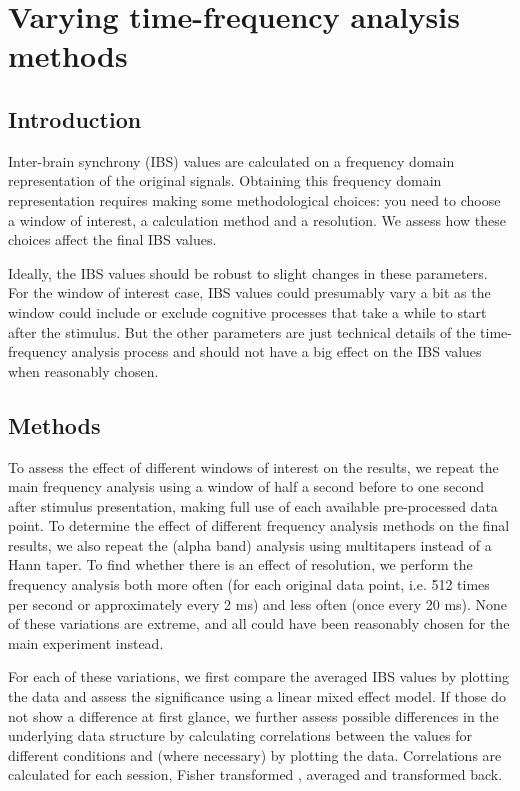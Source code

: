 
\section{Varying time-frequency analysis methods}

\subsection{Introduction}

Inter-brain synchrony (IBS) values are calculated on a frequency domain
representation of the original signals. Obtaining this frequency domain
representation requires making some methodological choices: you need to choose
a window of interest, a calculation method and a resolution. We assess how these
choices affect the final IBS values.

Ideally, the IBS values should be robust to slight changes in these parameters.
For the window of interest case, IBS values could presumably vary a bit as
the window could include or exclude cognitive processes that take a while to
start after the stimulus. But the other parameters are just technical details of
the time-frequency analysis process and should not have a big effect on the IBS
values when reasonably chosen.

\subsection{Methods}

To assess the effect of different windows of interest on the
results, we repeat the main frequency analysis using a window of half a second
before to one second after stimulus presentation, making full use of each
available pre-processed data point. To determine the effect of different
frequency analysis methods on the final results, we also repeat the (alpha band)
analysis using multitapers instead of a Hann taper. To find whether there is an
effect of resolution, we perform the frequency analysis both more often (for
each original data point, i.e. 512 times per second or approximately every 2 ms)
and less often (once every 20 ms). None of these variations are extreme, and all
could have been reasonably chosen for the main experiment instead.

For each of these variations, we first compare the averaged IBS values by
plotting the data and assess the significance using a linear mixed effect model.
If those do not show a difference at first glance, we further assess possible
differences in the underlying data structure by calculating correlations between
the values for different conditions and (where necessary) by plotting the data.
Correlations are calculated for each session, Fisher transformed
\parencite{fisher_frequency_1915}, averaged and transformed back.

